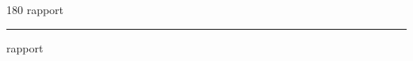 
\begin{frame}
\begin{center}
\begin{turn}{180}
{\fontsize{2.5cm}{1em}\selectfont rapport}
\end{turn}
\vspace{1em}\par  
\hrule
\vspace{1em}\par  
{\fontsize{2.5cm}{1em}\selectfont rapport}
\end{center}
\end{frame}
